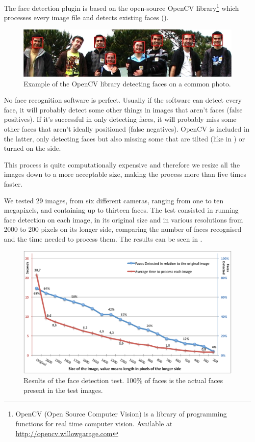 The face detection plugin is based on the open-source OpenCV library\footnote{OpenCV (Open Source Computer Vision) is a library of programming functions for real time computer vision. Available at \url{http://opencv.willowgarage.com}} which processes every image file and detects existing faces ().
 
\begin{figure}[ht]
	\centering
		\includegraphics[width=\columnwidth]{Figures/faces1.jpg}
	\caption{Example of the OpenCV library detecting faces on a common photo.}
	\label{fig:faces1}
\end{figure}

No face recognition software is perfect. Usually if the software can detect every face, it will probably detect some other things in images that aren't faces (false positives). If it’s successful in only detecting faces, it will probably miss some other faces that aren't ideally positioned (false negatives). OpenCV is included in the latter, only detecting faces but also missing some that are tilted (like in ) or turned on the side.


This process is quite computationally expensive and therefore we resize all the images down to a more acceptable size, making the process more than five times faster.

We tested 29 images, from six different cameras, ranging from one to ten megapixels, and containing up to thirteen faces. The test consisted in running face detection on each image, in its original size and in various resolutions from 2000 to 200 pixels on its longer side, comparing the number of faces recognised and the time needed to process them. The results can be seen in .

\begin{figure}[ht]
	\centering
		\includegraphics[width=\columnwidth]{Figures/graph2.pdf}
	\caption{Results of the face detection test. 100\% of faces is the actual faces present in the test images.}
	\label{fig:fdres}
\end{figure}

